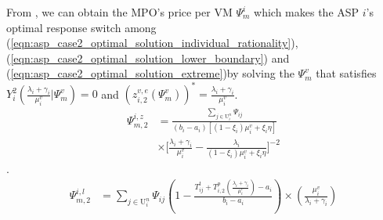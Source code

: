 \documentclass[conference]{IEEEtran}
\begin{document}

From , we can obtain the MPO's price per VM $\Psi_m^i$ which makes the ASP $i$'s optimal response switch among (\ref{eqn:asp_case2_optimal_solution_individual_rationality}), (\ref{eqn:asp_case2_optimal_solution_lower_boundary}) and (\ref{eqn:asp_case2_optimal_solution_extreme})by solving the $\Psi_m^v$ that satisfies $Y_i^2(\frac{\lambda_i+\gamma_i}{\mu_i^v}|\Psi_m^v) = 0$ and $(z_{i,2}^{v,e}(\Psi_m^v))^* = \frac{\lambda_i+\gamma_i}{\mu_i^v}$.
\begin{equation}
\begin{aligned}
\Psi_{m,2}^{i,z}&= \frac{\sum_{j \in \mathrm{U}_i^n}\Psi_{ij}}{(b_i-a_i)[(1-\xi_i)\mu_i^v + \xi_i \eta]} \\
& \times \big[\frac{\lambda_i+\gamma_i}{\mu_i^v} - \frac{\lambda_i}{(1-\xi_i)\mu_i^v + \xi_i\eta}\big]^{-2}
\end{aligned}
\end{equation}.
\begin{equation}
\begin{aligned}
\Psi_{m,2}^{i,l}&= \sum_{j \in \mathrm{U}_i^n}\Psi_{ij}(1-\frac{T_{ij}^t + T_{i,2}^p(\frac{\lambda_i+\gamma_i}{\mu_i^v})-a_i}{b_i-a_i})\times(\frac{\mu_i^v}{\lambda_i+\gamma_i})
\end{aligned}
\end{equation}
\iffalse
\end{document}
